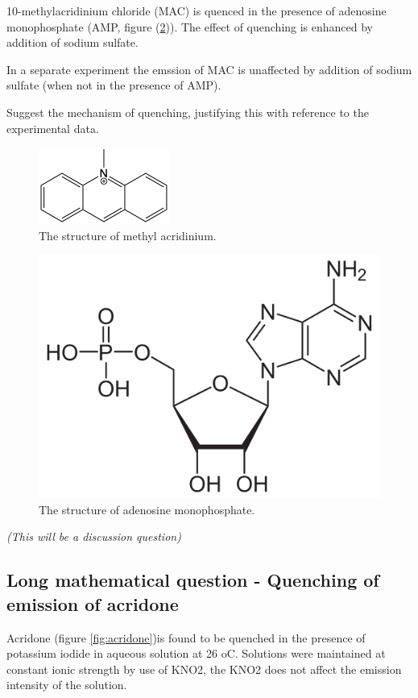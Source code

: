 \documentclass[
]{book}
\begin{document}
10-methylacridinium chloride (MAC) is quenced in the presence of adenosine monophosphate (AMP, figure (\ref{fig:AMP})). The effect of quenching is enhanced by addition of sodium sulfate.

In a separate experiment the emssion of MAC is unaffected by addition of sodium sulfate (when not in the presence of AMP).

Suggest the mechanism of quenching, justifying this with reference to the experimental data.

\begin{figure}

{\centering \includegraphics[width=0.3\linewidth]{images/MAC} 

}

\caption{The structure of methyl acridinium.}\label{fig:MAC}
\end{figure}

\begin{figure}

{\centering \includegraphics[width=0.3\linewidth]{images/AMP} 

}

\caption{The structure of adenosine monophosphate.}\label{fig:AMP}
\end{figure}

\emph{(This will be a discussion question)}

\hypertarget{sec:acridone}{%
\subsection{Long mathematical question - Quenching of emission of acridone}\label{sec:acridone}}

Acridone (figure \ref{fig:acridone})is found to be quenched in the presence of potassium iodide in aqueous solution at 26 oC. Solutions were maintained at constant ionic strength by use of KNO2, the KNO2 does not affect the emission intensity of the solution.
\end{document}
